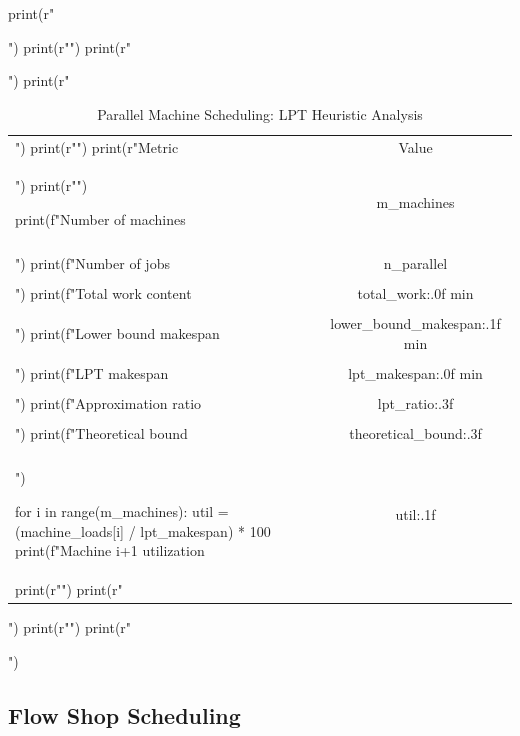 \documentclass[a4paper, 11pt]{article}
\begin{document}
\begin{pycode}
print(r"\begin{table}[htbp]")
print(r"\centering")
print(r"\caption{Parallel Machine Scheduling: LPT Heuristic Analysis}")
print(r"\begin{tabular}{lc}")
print(r"\toprule")
print(r"Metric & Value \\")
print(r"\midrule")

print(f"Number of machines & {m_machines} \\\\")
print(f"Number of jobs & {n_parallel} \\\\")
print(f"Total work content & {total_work:.0f} min \\\\")
print(f"Lower bound makespan & {lower_bound_makespan:.1f} min \\\\")
print(f"LPT makespan & {lpt_makespan:.0f} min \\\\")
print(f"Approximation ratio & {lpt_ratio:.3f} \\\\")
print(f"Theoretical bound & {theoretical_bound:.3f} \\\\")

for i in range(m_machines):
    util = (machine_loads[i] / lpt_makespan) * 100
    print(f"Machine {i+1} utilization & {util:.1f}\\%

print(r"\bottomrule")
print(r"\end{tabular}")
print(r"\label{tab:parallel}")
print(r"\end{table}")
\end{pycode}

\subsection{Flow Shop Scheduling}
\end{document}
